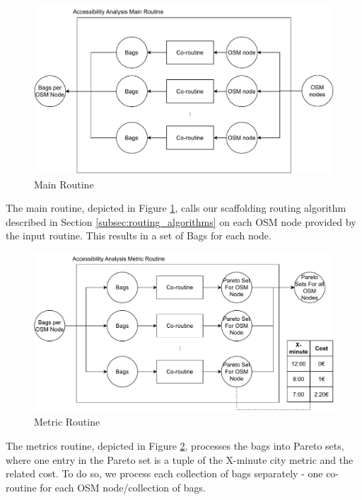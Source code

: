 \begin{figure}
    \centering
    \includegraphics[scale=0.75]{Figures/method/main_routine}
    \caption{Main Routine}
    \label{fig:main_routine}
\end{figure}
The main routine, depicted in Figure \ref{fig:main_routine}, calls our scaffolding routing algorithm described in Section \ref{subsec:routing_algorithms} on each OSM node provided by the input routine.
This results in a set of Bags for each node.

\begin{figure}
    \centering
    \includegraphics[scale=0.75]{Figures/method/metric_routine}
    \caption{Metric Routine}
    \label{fig:metric_routine}
\end{figure}
The metrics routine, depicted in Figure \ref{fig:metric_routine}, processes the bags into Pareto sets, where one entry in the Pareto set is a tuple of the X-minute city metric and the related cost.
To do so, we process each collection of bags separately - one co-routine for each OSM node/collection of bags.

